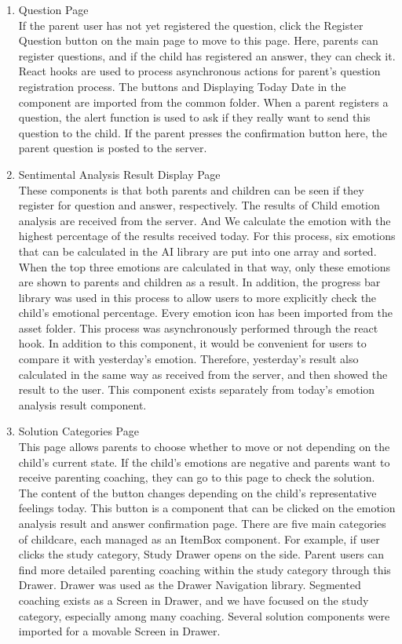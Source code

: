 \documentclass[conference]{IEEEtran}
\begin{document}
\begin{enumerate}
\begin{enumerate}
\begin{enumerate}
               \item Question Page
               \\If the parent user has not yet registered the question, click the Register Question button on the main page to move to this page. Here, parents can register questions, and if the child has registered an answer, they can check it. React hooks are used to process asynchronous actions for parent's question registration process. The buttons and Displaying Today Date in the component are imported from the common folder. When a parent registers a question, the alert function is used to ask if they really want to send this question to the child. If the parent presses the confirmation button here, the parent question is posted to the server.
               \item Sentimental Analysis Result Display Page
               \\These components is that both parents and children can be seen if they register for question and answer, respectively. The results of Child emotion analysis are received from the server. And We calculate the emotion with the highest percentage of the results received today. For this process, six emotions that can be calculated in the AI library are put into one array and sorted. When the top three emotions are calculated in that way, only these emotions are shown to parents and children as a result. In addition, the progress bar library was used in this process to allow users to more explicitly check the child's emotional percentage. Every emotion icon has been imported from the asset folder. This process was asynchronously performed through the react hook. In addition to this component, it would be convenient for users to compare it with yesterday's emotion. Therefore, yesterday's result also calculated in the same way as received from the server, and then showed the result to the user. This component exists separately from today's emotion analysis result component.
               \item Solution Categories Page
               \\This page allows parents to choose whether to move or not depending on the child's current state. If the child's emotions are negative and parents want to receive parenting coaching, they can go to this page to check the solution. The content of the button changes depending on the child's representative feelings today. This button is a component that can be clicked on the emotion analysis result and answer confirmation page. There are five main categories of childcare, each managed as an ItemBox component. For example, if user clicks the study category, Study Drawer opens on the side. Parent users can find more detailed parenting coaching within the study category through this Drawer. Drawer was used as the Drawer Navigation library. Segmented coaching exists as a Screen in Drawer, and we have focused on the study category, especially among many coaching. Several solution components were imported for a movable Screen in Drawer.

\end{enumerate}
\end{enumerate}
\end{enumerate}
\end{document}
